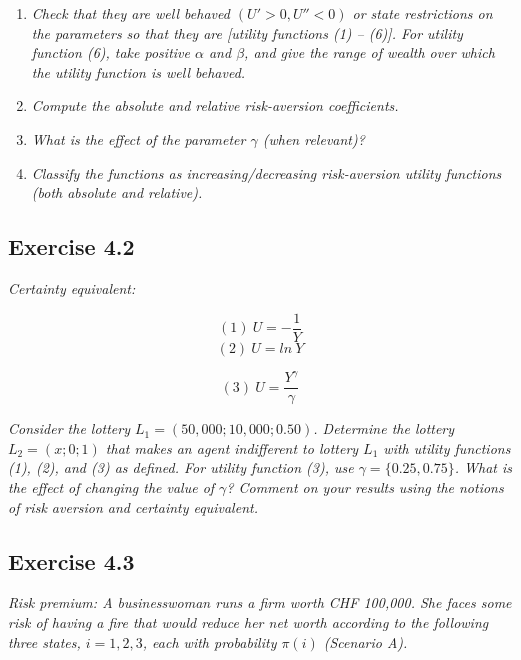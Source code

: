 \documentclass[]{book}
\theoremstyle{definition}
\theoremstyle{definition}
\theoremstyle{remark}
\begin{document}
\begin{enumerate}
\def\labelenumi{\alph{enumi}.}
\item
  \emph{Check that they are well behaved \(\left(U'>0,U''<0\right)\) or
  state restrictions on the parameters so that they are {[}utility
  functions (1) -- (6){]}. For utility function (6), take positive
  \(\alpha\) and \(\beta\), and give the range of wealth over which the
  utility function is well behaved.} \citep[p.6]{exercises_danthine}
\item
  \emph{Compute the absolute and relative risk-aversion coefficients.}
  \citep[p.6]{exercises_danthine}
\item
  \emph{What is the effect of the parameter \(\gamma\) (when relevant)?}
  \citep[p.6]{exercises_danthine}
\item
  \emph{Classify the functions as increasing/decreasing risk-aversion
  utility functions (both absolute and relative).}
  \citep[p.6]{exercises_danthine}
\end{enumerate}

\subsection{Exercise 4.2}\label{exercise-4.2}

\emph{Certainty equivalent:} \citep[p.6]{exercises_danthine}

\[\left(1\right) \ U=-\frac{1}{Y}\] \[\left(2\right) \ U=ln \ Y\]

\[\left(3\right) \ U=\frac{Y^\gamma}{\gamma}\]

\emph{Consider the lottery \(L_1=\left(50,000;10,000;0.50\right)\).
Determine the lottery \(L_2=\left(x;0;1\right)\) that makes an agent
indifferent to lottery \(L_1\) with utility functions (1), (2), and (3)
as defined. For utility function (3), use \(\gamma=\{0.25,0.75\}\). What
is the effect of changing the value of \(\gamma\)? Comment on your
results using the notions of risk aversion and certainty equivalent.}
\citep[p.6]{exercises_danthine}

\subsection{Exercise 4.3}\label{exercise-4.3}

\emph{Risk premium: A businesswoman runs a firm worth CHF 100,000. She
faces some risk of having a fire that would reduce her net worth
according to the following three states, \(i=1,2,3\), each with
probability \(\pi\left(i\right)\) (Scenario A).}
\citep[p.7]{exercises_danthine}
\end{document}
